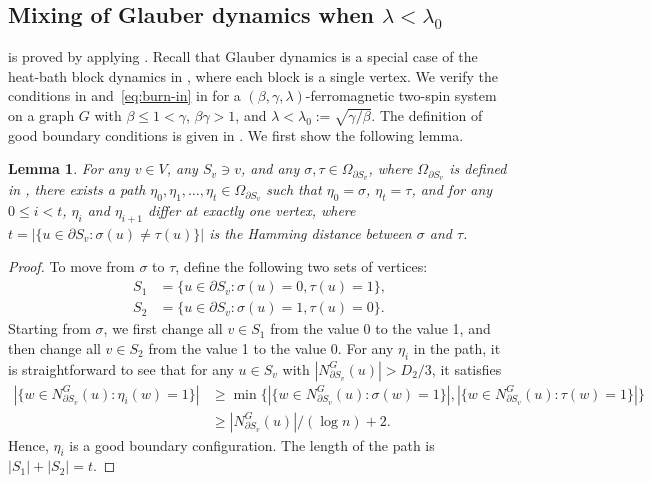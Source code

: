 \documentclass[11pt]{amsart}
\newcommand{\defeq}{:=}
\newcommand{\nbd}[2]{N_{#1}^{#2}}
\newtheorem{lemma}[theorem]{Lemma}
\theoremstyle{definition}
\theoremstyle{remark}
\begin{document}
\subsection{Mixing of Glauber dynamics when \texorpdfstring{$\lambda < \lambda_0$}{lambda < lambda0}}\label{sec:glauber-mixing-2}
 is proved by applying .
Recall that Glauber dynamics is a special case of the heat-bath block dynamics in  , where each block is a single vertex.
We verify the conditions in  and~\eqref{eq:burn-in} in  for a $(\beta,\gamma,\lambda)$-ferromagnetic two-spin system on a graph $G$ with $\beta \leq 1 < \gamma$, $\beta\gamma > 1$, and $\lambda < \lambda_0 \defeq \sqrt{\gamma/\beta}$.
The definition of good boundary conditions is given in . We first show the following lemma.

\begin{lemma}\label{lemma:close-under-shortest-path}
  For any $v \in V$, any $S_v\ni v$, and any $\sigma,\tau \in \Omega_{\partial S_v}$, where $\Omega_{\partial S_v}$ is defined in , there exists a path $\eta_0,\eta_1,\ldots,\eta_t \in \Omega_{\partial S_v}$ such that $\eta_0 = \sigma$, $\eta_t = \tau$, and for any $0 \leq i < t$, $\eta_i$ and $\eta_{i+1}$ differ at exactly one vertex, where
$t = |\{u \in \partial S_v : \sigma(u) \neq \tau(u)\}|$
is the Hamming distance between $\sigma$ and $\tau$.
\end{lemma}
\begin{proof}
To move from $\sigma$ to $\tau$, define the following two sets of vertices:
\begin{align*}
    S_1 &= \{u \in \partial S_v: \sigma(u) = 0, \tau(u) = 1\},\\
    S_2 &= \{u \in \partial S_v: \sigma(u) = 1, \tau(u) = 0\}.
\end{align*}
Starting from $\sigma$, we first change all $v \in S_1$ from the value 0 to the value 1, and then change all $v \in S_2$ from the value 1 to the value 0. For any $\eta_i$ in the path, it is straightforward to see that for any $u \in S_v$ with $|\nbd{\partial S_v}{G}(u)|>D_2/3$, it satisfies
\begin{align*}
    |\{w\in \nbd{\partial S_v}{G}(u): \eta_i(w) = 1\}| &\geq  \min\{|\{w\in \nbd{\partial S_v}{G}(u): \sigma(w) = 1\}| , |\{w\in \nbd{\partial S_v}{G}(u): \tau(w) = 1\}|  \} \\
    &\geq |\nbd{\partial S_v}{G}(u)|/(\log n) + 2.
\end{align*}  
Hence, $\eta_i$ is a good boundary configuration. The length of the path is  $|S_1| + |S_2| = t$.
\end{proof}
\end{document}
